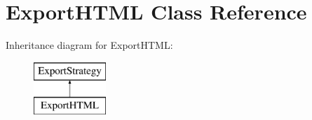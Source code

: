 \hypertarget{class_export_h_t_m_l}{\section{Export\-H\-T\-M\-L Class Reference}
\label{class_export_h_t_m_l}
}
Inheritance diagram for Export\-H\-T\-M\-L\-:\begin{figure}[H]
\begin{center}
\leavevmode
\includegraphics[height=2.000000cm]{class_export_h_t_m_l}
\end{center}
\end{figure}
